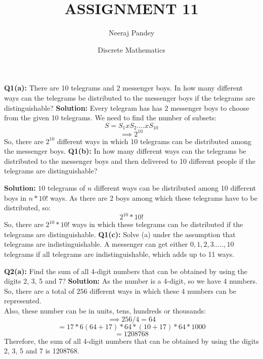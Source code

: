 \documentclass{article}
\title{ASSIGNMENT 11}
\author{Neeraj Pandey}
\date{Discrete Mathematics}
\begin{document}
\maketitle
\begin{flushleft}
\newcommand\tab[1][1cm]{\hspace*{#1}}
\textbf{Q1(a): } There are 10 telegrams and 2 messenger boys. In how many different ways can the telegrams be
distributed to the messenger boys if the telegrams are distinguishable?
\newline
\newline
\textbf{Solution: } Every telegram has has 2 messenger boys to choose from the given 10 telegrams. We need to find the number of subsets:
\[ S = S_{1} x S_{2} .... x S_{10}\]
\[\implies 2^{10}\]
\newline
So, there are $2^{10}$ different ways in which 10 telegrams can be distributed among the messenger boys.
\newline
\newline
\textbf{Q1(b): } In how many different ways can the telegrams be distributed to the messenger boys and then
delivered to 10 different people if the telegrams are distinguishable?
\newline
\newline

\textbf{Solution: }$10$ telegrams of $n$ different ways can be distributed among 10 different boys in $n * 10!$ ways.
As there are 2 boys among which these telegrams have to be distributed, so:
\[2^{10} * 10!\]
So, there are $2^{10} * 10!$ ways in which these telegrams can be distributed if the telegrams are distinguishable.
\newline 
\newline
\textbf{Q1(c): } Solve (a) under the assumption that telegrams are indistinguishable.
\newline
\newline 
A messenger can get either $0, 1, 2, 3.....,10$ telegrams if all telegrams are indistinguishable, which adds up to 11 ways.
\newline
\newline

\textbf{Q2(a): } Find the sum of all 4-digit numbers that can be obtained by using the digits 2, 3, 5 and 7?
\newline
\newline
\textbf{Solution: } As the number is a 4-digit, so we have 4 numbers. So, there are a total of $256$ different ways in which these 4 numbers can be represented.\\
Also, these number can be in units, tens, hundreds or thousands:
\[\implies 256/4 = 64\]
\[= 17 * 6(64 + 17) * 64 * (10 + 17) * 64 * 1000\]
\[= 1208768\]
Therefore, the sum of all 4-digit numbers that can be obtained by using the digits 2, 3, 5 and 7 is 1208768.


\end{flushleft}
\end{document}
